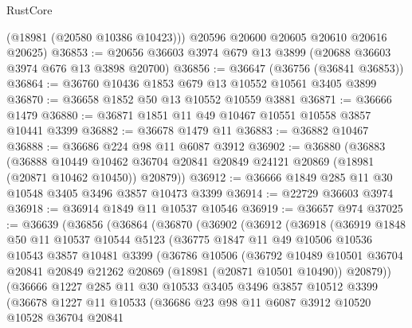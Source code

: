 \begin{lexlean}{RustCore}
\begin{coremodule}
        (@18981 (@20580 @10386 @10423)))
      @20596
      @20600
      @20605
      @20610
      @20616
      @20625)
@36853 := @20656 @36603 @3974 @679 @13 @3899 (@20688 @36603 @3974 @676 @13 @3898 @20700)
@36856 := @36647 (@36756 (@36841 @36853))
@36864 := @36760 @10436 @1853 @679 @13 @10552 @10561 @3405 @3899
@36870 := @36658 @1852 @50 @13 @10552 @10559 @3881
@36871 := @36666 @1479
@36880 := @36871 @1851 @11 @49 @10467 @10551 @10558 @3857 @10441 @3399
@36882 := @36678 @1479 @11
@36883 := @36882 @10467
@36888 := @36686 @224 @98 @11 @6087 @3912
@36902 := @36880
    (@36883
      (@36888
        @10449
        @10462
        @36704
        @20841
        @20849
        @24121
        @20869
        (@18981 (@20871 @10462 @10450))
        @20879))
@36912 := @36666 @1849 @285 @11 @30 @10548 @3405 @3496 @3857 @10473 @3399
@36914 := @22729 @36603 @3974
@36918 := @36914 @1849 @11 @10537 @10546
@36919 := @36657 @974
@37025 := @36639
    (@36856
      (@36864
        (@36870
          (@36902
            (@36912
              (@36918
                (@36919
                  @1848
                  @50
                  @11
                  @10537
                  @10544
                  @5123
                  (@36775
                    @1847
                    @11
                    @49
                    @10506
                    @10536
                    @10543
                    @3857
                    @10481
                    @3399
                    (@36786
                      @10506
                      (@36792
                        @10489
                        @10501
                        @36704
                        @20841
                        @20849
                        @21262
                        @20869
                        (@18981 (@20871 @10501 @10490))
                        @20879))
                    (@36666
                      @1227
                      @285
                      @11
                      @30
                      @10533
                      @3405
                      @3496
                      @3857
                      @10512
                      @3399
                      (@36678
                        @1227
                        @11
                        @10533
                        (@36686
                          @23
                          @98
                          @11
                          @6087
                          @3912
                          @10520
                          @10528
                          @36704
                          @20841

\end{coremodule}
\end{lexlean}
